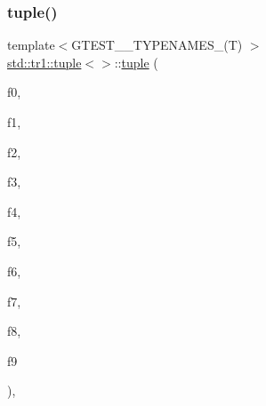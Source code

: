 \subsubsection{\texorpdfstring{tuple()}{tuple()}\hspace{0.1cm}{\footnotesize\ttfamily [2/4]}}
{\footnotesize\ttfamily template$<$G\+T\+E\+S\+T\+\_\+\_\+\+T\+Y\+P\+E\+N\+A\+M\+E\+S\+\_\+(\+T) $>$ \\
\mbox{\hyperlink{classstd_1_1tr1_1_1tuple}{std\+::tr1\+::tuple}}$<$$>$\+::\mbox{\hyperlink{classstd_1_1tr1_1_1tuple}{tuple}} (\begin{DoxyParamCaption}\item[{\mbox{\hyperlink{namespacestd_1_1tr1_ae7b5ea477ac34a3eef5c4c15c42b76ed}{G\+T\+E\+S\+T\+\_\+\+B\+Y\+\_\+\+R\+E\+F\+\_\+}}(T0)}]{f0,  }\item[{\mbox{\hyperlink{namespacestd_1_1tr1_ae7b5ea477ac34a3eef5c4c15c42b76ed}{G\+T\+E\+S\+T\+\_\+\+B\+Y\+\_\+\+R\+E\+F\+\_\+}}(T1)}]{f1,  }\item[{\mbox{\hyperlink{namespacestd_1_1tr1_ae7b5ea477ac34a3eef5c4c15c42b76ed}{G\+T\+E\+S\+T\+\_\+\+B\+Y\+\_\+\+R\+E\+F\+\_\+}}(T2)}]{f2,  }\item[{\mbox{\hyperlink{namespacestd_1_1tr1_ae7b5ea477ac34a3eef5c4c15c42b76ed}{G\+T\+E\+S\+T\+\_\+\+B\+Y\+\_\+\+R\+E\+F\+\_\+}}(T3)}]{f3,  }\item[{\mbox{\hyperlink{namespacestd_1_1tr1_ae7b5ea477ac34a3eef5c4c15c42b76ed}{G\+T\+E\+S\+T\+\_\+\+B\+Y\+\_\+\+R\+E\+F\+\_\+}}(T4)}]{f4,  }\item[{\mbox{\hyperlink{namespacestd_1_1tr1_ae7b5ea477ac34a3eef5c4c15c42b76ed}{G\+T\+E\+S\+T\+\_\+\+B\+Y\+\_\+\+R\+E\+F\+\_\+}}(T5)}]{f5,  }\item[{\mbox{\hyperlink{namespacestd_1_1tr1_ae7b5ea477ac34a3eef5c4c15c42b76ed}{G\+T\+E\+S\+T\+\_\+\+B\+Y\+\_\+\+R\+E\+F\+\_\+}}(T6)}]{f6,  }\item[{\mbox{\hyperlink{namespacestd_1_1tr1_ae7b5ea477ac34a3eef5c4c15c42b76ed}{G\+T\+E\+S\+T\+\_\+\+B\+Y\+\_\+\+R\+E\+F\+\_\+}}(T7)}]{f7,  }\item[{\mbox{\hyperlink{namespacestd_1_1tr1_ae7b5ea477ac34a3eef5c4c15c42b76ed}{G\+T\+E\+S\+T\+\_\+\+B\+Y\+\_\+\+R\+E\+F\+\_\+}}(T8)}]{f8,  }\item[{\mbox{\hyperlink{namespacestd_1_1tr1_ae7b5ea477ac34a3eef5c4c15c42b76ed}{G\+T\+E\+S\+T\+\_\+\+B\+Y\+\_\+\+R\+E\+F\+\_\+}}(T9)}]{f9 }\end{DoxyParamCaption})\hspace{0.3cm}{\ttfamily [inline]}, {\ttfamily [explicit]}}

